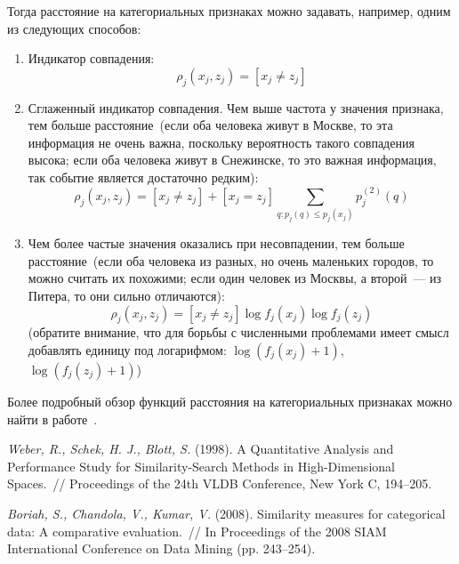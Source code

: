 \documentclass[12pt,fleqn]{article}
\begin{document}
        Тогда расстояние на категориальных признаках можно задавать, например, одним из следующих способов:
        \begin{enumerate}
            \item Индикатор совпадения:
                \[
                    \rho_j(x_j, z_j)
                    =
                    [x_j \neq z_j]
                \]
            \item Сглаженный индикатор совпадения. Чем выше частота у значения признака, тем больше расстояние~(если оба человека живут в Москве,
                то эта информация не очень важна, поскольку вероятность такого совпадения высока; если оба человека
                живут в Снежинске, то это важная информация, так событие является достаточно редким):
                \[
                    \rho_j(x_j, z_j)
                    =
                    [x_j \neq z_j]
                    +
                    [x_j = z_j]
                    \sum_{q: p_j(q) \leq p_j(x_j)} p_j^{(2)}(q)
                \]
            \item Чем более частые значения оказались при несовпадении, тем больше расстояние~(если оба человека из разных, но
                очень маленьких городов, то можно считать их похожими; если один человек из Москвы, а второй~--- из Питера,
                то они сильно отличаются):
                \[
                    \rho_j(x_j, z_j)
                    =
                    [x_j \neq z_j]
                    \log f_j(x_j)
                    \log f_j(z_j)
                \]
                (обратите внимание, что для борьбы с численными проблемами имеет смысл добавлять единицу под логарифмом:
                $\log(f_j(x_j) + 1)$, $\log(f_j(z_j) + 1)$)
        \end{enumerate}
        Более подробный обзор функций расстояния на категориальных признаках можно найти в работе~\cite{boriah08categorical}.


\begin{thebibliography}{1}
    \emph{Weber, R., Schek, H. J.,  Blott, S.} (1998).
    A Quantitative Analysis and Performance Study for Similarity-Search Methods
    in High-Dimensional Spaces.~// Proceedings of the 24th VLDB Conference, New York C, 194–205.

    \emph{Boriah, S., Chandola, V., Kumar, V.} (2008).
    Similarity measures for categorical data: A comparative evaluation.~//
    In Proceedings of the 2008 SIAM International Conference on Data Mining (pp. 243–254).
\end{thebibliography}
\end{document}

